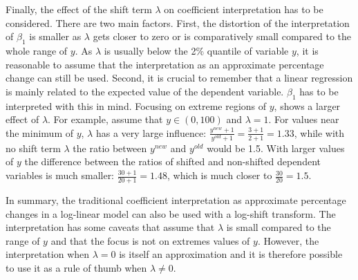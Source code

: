 Finally, the effect of the shift term $\lambda$ on coefficient interpretation has to be considered.
There are two main factors.
First, the distortion of the interpretation of $\beta_1$ is smaller as $\lambda$ gets closer to zero or is comparatively small compared to the whole range of $y$.
As $\lambda$ is usually below the 2\% quantile of variable $y$, it is reasonable to assume that the interpretation as an approximate percentage change can still be used.
Second, it is crucial to remember that a linear regression is mainly related to the expected value of the dependent variable.
$\beta_1$ has to be interpreted with this in mind.
Focusing on extreme regions of $y$, shows a larger effect of $\lambda$.
For example, assume that $y \in (0, 100)$ and $\lambda = 1$.
For values near the minimum of $y$, $\lambda$ has a very large influence: $\frac{y^{new} + 1 } {y^{old} + 1} = \frac{3 + 1}  {2 + 1} = 1.33$, while with no shift term $\lambda$ the ratio between $y^{new}$ and $y^{old}$ would be 1.5. With larger values of $y$ the difference between the ratios of shifted and non-shifted dependent variables is much smaller: $\frac{30 + 1}{20 + 1} = 1.48$, which is much closer to $\frac{30}{20} = 1.5$.

In summary, the traditional coefficient interpretation as approximate percentage changes in a log-linear model can also be used with a log-shift transform.
The interpretation has some caveats that assume that $\lambda$ is small compared to the range of $y$ and that the focus is not on extremes values of $y$.
However, the interpretation when $\lambda = 0$ is itself an approximation and it is therefore possible to use it as a rule of thumb when $\lambda \ne 0$.